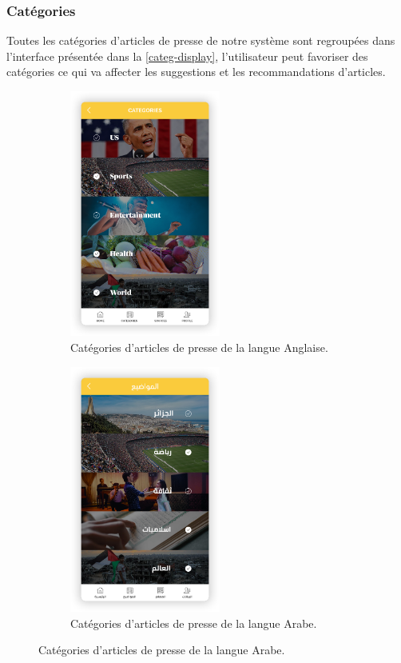    \subsubsection{Catégories}
Toutes les catégories d'articles de presse de notre système sont regroupées dans l'interface présentée dans la \autoref{categ-display}, l'utilisateur peut favoriser des catégories ce qui va affecter les suggestions et les recommandations d'articles. 
\begin{figure}[H]
    \begin{minipage}{0.48\textwidth}
        \begin{figure}[H]
            \centering
            \includegraphics[width=140pt]{img/chapter4/feedny/en-categ.png}
            \caption{Catégories d'articles de presse de la langue Anglaise.}
        \end{figure}
    \end{minipage}\hfill
    \begin {minipage}{0.48\textwidth}
    \begin{figure}[H]
        \centering
        \includegraphics[width=140pt]{img/chapter4/feedny/ar-categ.png}
        \caption{Catégories d'articles de presse de la langue Arabe.}
    \end{figure}
\end{minipage}
\label{categ-display}
\end{figure}

